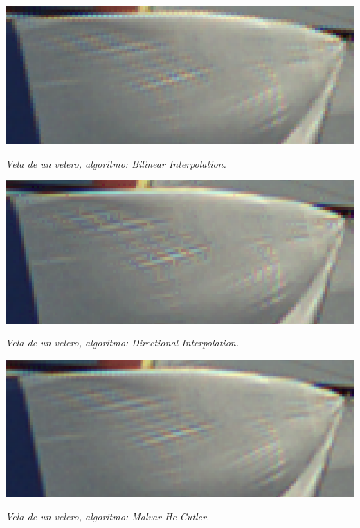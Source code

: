 	\begin{center}
		\includegraphics[scale=.5]{../enunciado/images_files/cualitativo/sailing_boat_bilinear.png}
		\vspace{2pt}
		\par
		\footnotesize\textit{Vela de un velero, algoritmo: Bilinear Interpolation.}
	\end{center}


	\begin{center}
		\includegraphics[scale=.5]{../enunciado/images_files/cualitativo/sailing_boat_directional.png}
		\vspace{2pt}
		\par
		\footnotesize\textit{Vela de un velero, algoritmo: Directional Interpolation.}
	\end{center}


	\begin{center}
		\includegraphics[scale=.5]{../enunciado/images_files/cualitativo/sailing_boat_malvar.png}
		\vspace{2pt}
		\par
		\footnotesize\textit{Vela de un velero, algoritmo: Malvar He Cutler.}
	\end{center}



